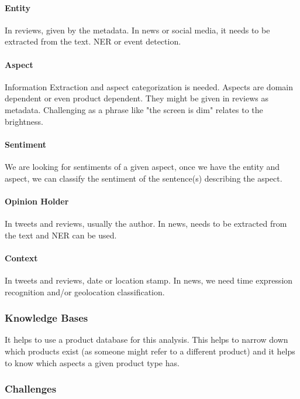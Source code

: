 \paragraph{Entity}

In reviews, given by the metadata. In news or social media, it needs
to be extracted
from the text. NER or event detection.

\paragraph{Aspect}

Information Extraction and aspect categorization is needed. Aspects
are domain dependent
or even product dependent. They might be given in reviews as
metadata. Challenging as a
phrase like "the screen is dim" relates to the brightness.

\paragraph{Sentiment}

We are looking for sentiments of a given aspect, once we have the
entity and aspect, we
can classify the sentiment of the sentence(s) describing the aspect.

\paragraph{Opinion Holder}

In tweets and reviews, usually the author. In news, needs to be
extracted from the
text and NER can be used.

\paragraph{Context}

In tweets and reviews, date or location stamp. In news, we need time expression
recognition and/or geolocation classification.

\subsubsection{Knowledge Bases}

It helps to use a product database for this analysis. This helps to narrow down
which products exist (as someone might refer to a different product)
and it helps to know
which aspects a given product type has.

\subsubsection{Challenges}

